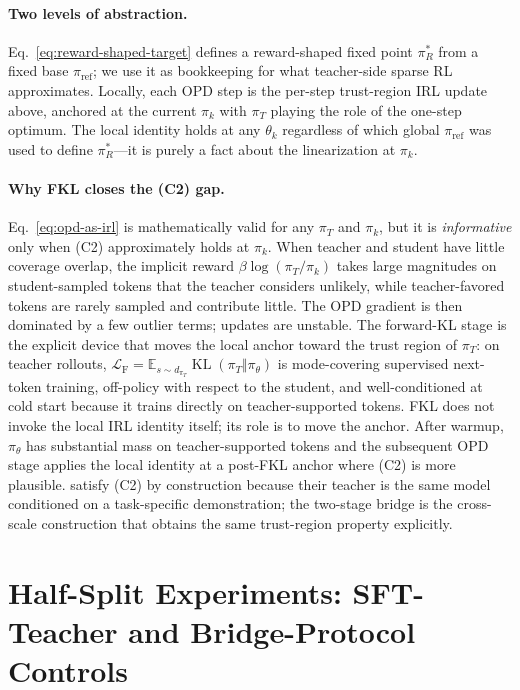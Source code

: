 \documentclass{article}
\begin{document}
\paragraph{Two levels of abstraction.} Eq.~\ref{eq:reward-shaped-target} defines a reward-shaped fixed point $\pi_R^*$ from a fixed base $\pi_{\mathrm{ref}}$; we use it as bookkeeping for what teacher-side sparse RL approximates. Locally, each OPD step is the per-step trust-region IRL update above, anchored at the current $\pi_k$ with $\pi_T$ playing the role of the one-step optimum. The local identity holds at any $\theta_k$ regardless of which global $\pi_{\mathrm{ref}}$ was used to define $\pi_R^*$---it is purely a fact about the linearization at $\pi_k$.

\paragraph{Why FKL closes the (C2) gap.} Eq.~\ref{eq:opd-as-irl} is mathematically valid for any $\pi_T$ and $\pi_k$, but it is \emph{informative} only when (C2) approximately holds at $\pi_k$. When teacher and student have little coverage overlap, the implicit reward $\beta\log(\pi_T/\pi_k)$ takes large magnitudes on student-sampled tokens that the teacher considers unlikely, while teacher-favored tokens are rarely sampled and contribute little. The OPD gradient is then dominated by a few outlier terms; updates are unstable. The forward-KL stage is the explicit device that moves the local anchor toward the trust region of $\pi_T$: on teacher rollouts, $\mathcal{L}_{\mathrm{F}}=\mathbb{E}_{s\sim d_{\pi_T}}\operatorname{KL}(\pi_T\Vert\pi_\theta)$ is mode-covering supervised next-token training, off-policy with respect to the student, and well-conditioned at cold start because it trains directly on teacher-supported tokens. FKL does not invoke the local IRL identity itself; its role is to move the anchor. After warmup, $\pi_\theta$ has substantial mass on teacher-supported tokens and the subsequent OPD stage applies the local identity at a post-FKL anchor where (C2) is more plausible. \citet{shenfeld2026selfdistillation} satisfy (C2) by construction because their teacher is the same model conditioned on a task-specific demonstration; the two-stage bridge is the cross-scale construction that obtains the same trust-region property explicitly.

\section{Half-Split Experiments: SFT-Teacher and Bridge-Protocol Controls}
\label{app:half-split}
\end{document}
